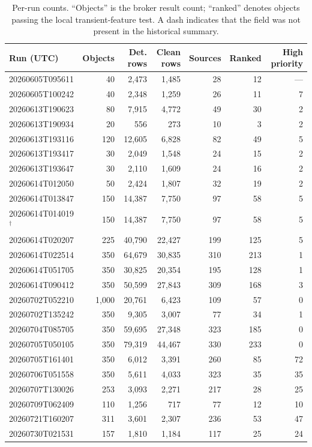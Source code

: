 \documentclass[11pt]{article}
\begin{document}
\begin{table}[ht]
\centering
\scriptsize
\caption{Per-run counts. ``Objects'' is the broker result count; ``ranked'' denotes objects passing the local transient-feature test. A dash indicates that the field was not present in the historical summary.}
\label{tab:runs}
\begin{tabular}{lrrrrrr}
\toprule
Run (UTC) & Objects & Det. rows & Clean rows & Sources & Ranked & High priority \\
\midrule
20260605T095611 & 40 & 2,473 & 1,485 & 28 & 12 & --- \\
20260605T100242 & 40 & 2,348 & 1,259 & 26 & 11 & 7 \\
20260613T190623 & 80 & 7,915 & 4,772 & 49 & 30 & 2 \\
20260613T190934 & 20 & 556 & 273 & 10 & 3 & 2 \\
20260613T193116 & 120 & 12,605 & 6,828 & 82 & 49 & 5 \\
20260613T193417 & 30 & 2,049 & 1,548 & 24 & 15 & 2 \\
20260613T193647 & 30 & 2,110 & 1,609 & 24 & 16 & 2 \\
20260614T012050 & 50 & 2,424 & 1,807 & 32 & 19 & 2 \\
20260614T013847 & 150 & 14,387 & 7,750 & 97 & 58 & 5 \\
20260614T014019$^\dagger$ & 150 & 14,387 & 7,750 & 97 & 58 & 5 \\
20260614T020207 & 225 & 40,790 & 22,427 & 199 & 125 & 5 \\
20260614T022514 & 350 & 64,679 & 30,835 & 310 & 213 & 1 \\
20260614T051705 & 350 & 30,825 & 20,354 & 195 & 128 & 1 \\
20260614T090412 & 350 & 50,599 & 27,843 & 309 & 168 & 3 \\
20260702T052210 & 1,000 & 20,761 & 6,423 & 109 & 57 & 0 \\
20260702T135242 & 350 & 9,305 & 3,007 & 77 & 34 & 1 \\
20260704T085705 & 350 & 59,695 & 27,348 & 323 & 185 & 0 \\
20260705T050105 & 350 & 79,319 & 44,467 & 330 & 233 & 0 \\
20260705T161401 & 350 & 6,012 & 3,391 & 260 & 85 & 72 \\
20260706T051558 & 350 & 5,611 & 4,033 & 323 & 35 & 35 \\
20260707T130026 & 253 & 3,093 & 2,271 & 217 & 28 & 25 \\
20260709T062409 & 110 & 1,256 & 717 & 77 & 12 & 10 \\
20260721T160207 & 311 & 3,601 & 2,307 & 236 & 53 & 47 \\
20260730T021531 & 157 & 1,810 & 1,184 & 117 & 25 & 24 \\
\bottomrule
\end{tabular}
\end{table}
\end{document}
